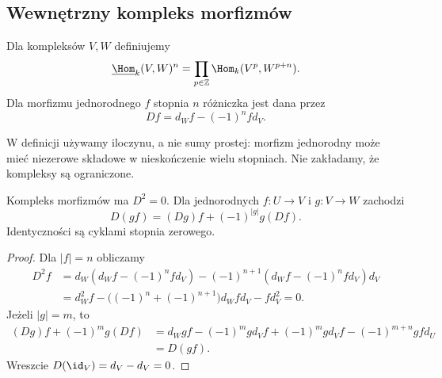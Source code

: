 \subsection{Wewnętrzny kompleks morfizmów}

\begin{definicja}\label{cat:def:dg-hom-complex}
Dla kompleksów $V,W$ definiujemy
\[
 \underline{\Hom}_k(V,W)^n=
 \prod_{p\in\mathbb Z}\Hom_k(V^p,W^{p+n}).
\]
Dla morfizmu jednorodnego $f$ stopnia $n$ różniczka jest dana przez
\begin{equation}\label{cat:eq:dg-hom-differential}
 Df=d_W f-(-1)^n f d_V.
\end{equation}
\end{definicja}

W definicji używamy iloczynu, a nie sumy prostej: morfizm jednorodny może mieć niezerowe składowe w nieskończenie wielu stopniach. Nie zakładamy, że kompleksy są ograniczone.

\begin{stwierdzenie}\label{cat:prop:dg-hom-leibniz}
Kompleks morfizmów ma $D^2=0$. Dla jednorodnych $f:U\to V$ i $g:V\to W$ zachodzi
\[
 D(gf)=(Dg)f+(-1)^{|g|}g(Df).
\]
Identyczności są cyklami stopnia zerowego.
\end{stwierdzenie}
\begin{proof}
Dla $|f|=n$ obliczamy
\[
\begin{aligned}
 D^2f
 &=d_W(d_W f-(-1)^nf d_V)
    -(-1)^{n+1}(d_W f-(-1)^nf d_V)d_V\\
 &=d_W^2 f-
   \bigl((-1)^n+(-1)^{n+1}\bigr)d_W f d_V-fd_V^2=0.
\end{aligned}
\]
Jeżeli $|g|=m$, to
\[
\begin{aligned}
 (Dg)f+(-1)^m g(Df)
 &=d_Wgf-(-1)^m gd_Vf
   +(-1)^m gd_Vf-(-1)^{m+n}gfd_U\\
 &=D(gf).
\end{aligned}
\]
Wreszcie $D(\id_V)=d_V-d_V=0$.
\end{proof}

